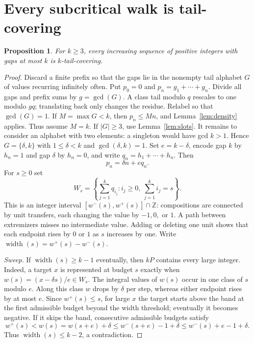 \documentclass[11pt,a4paper,reqno]{amsart}
\newtheorem{proposition}[theorem]{Proposition}
\theoremstyle{definition}
\theoremstyle{remark}
\newcommand{\ZZ}{\mathbb Z}
\begin{document}
\section{Every subcritical walk is tail-covering}
\begin{proposition}\label{prop:walk}
For $k\ge3$, every increasing sequence of positive integers with gaps at
most $k$ is $k$-tail-covering.
\end{proposition}
\begin{proof}
Discard a finite prefix so that the gaps lie in the nonempty tail alphabet
$G$ of values recurring infinitely often. Put $p_0=0$ and
$p_n=g_1+\cdots+g_n$. Divide all gaps and prefix sums by $g=\gcd(G)$.
A class tail modulo $q$ rescales to one modulo $gq$; translating back only
changes the residue. Relabel so that $\gcd(G)=1$.
If $M=\max G<k$, then $p_n\le Mn$, and Lemma~\ref{lem:density} applies.
Thus assume $M=k$. If $|G|\ge3$, use Lemma~\ref{lem:slots}.
It remains to consider an alphabet with two elements: a singleton would have
gcd $k>1$. Hence $G=\{\delta,k\}$ with $1\le\delta<k$ and $\gcd(\delta,k)=1$.
Set $e=k-\delta$, encode gap $k$ by $h_n=1$ and gap $\delta$ by $h_n=0$,
and write $q_n=h_1+\cdots+h_n$. Then
\begin{equation}\label{eq:prefix-binary}
 p_n=\delta n+e q_n.
\end{equation}
For $s\ge0$ set
\[
 W_s=\left\{\sum_{j=1}^kq_{i_j}:i_j\ge0,\ \sum_{j=1}^ki_j=s\right\}.
\]
This is an integer interval $[w^-(s),w^+(s)]\cap\ZZ$: compositions are
connected by unit transfers, each changing the value by $-1,0,$ or $1$.
A path between extremizers misses no intermediate value. Adding or deleting
one unit shows that each endpoint rises by $0$ or $1$ as $s$ increases by one.
Write $\operatorname{width}(s)=w^+(s)-w^-(s)$.

\medskip\noindent\emph{Sweep.} If $\operatorname{width}(s)\ge k-1$
eventually, then $kP$ contains every large integer. Indeed, a target $x$
is represented at budget $s$ exactly when $w(s)=(x-\delta s)/e\in W_s$.
The integral values of $w(s)$ occur in one class of $s$ modulo $e$.
Along this class $w$ drops by $\delta$ per step, whereas either endpoint
rises by at most $e$. Since $w^+(s)\le s$, for large $x$ the target starts
above the band at the first admissible budget beyond the width threshold;
eventually it becomes negative. If it skips the band, consecutive admissible
budgets satisfy
\[
 w^+(s)<w(s)=w(s+e)+\delta
 \le w^-(s+e)-1+\delta\le w^-(s)+e-1+\delta.
\]
Thus $\operatorname{width}(s)\le k-2$, a contradiction.


\end{proof}
\end{document}
